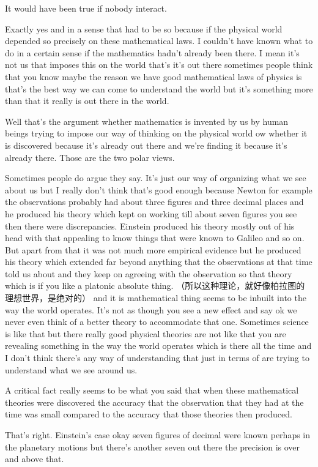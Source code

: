 \documentclass{article}
\begin{document}
It would have been true if nobody interact.

Exactly yes and in a sense that had to be so because if the physical world depended so precisely on these mathematical laws. I couldn't have known what to do in a certain sense if the mathematics hadn't already been there. I mean it's not us that imposes this on the world that's it's out there sometimes people think that you know maybe the reason we have good mathematical laws of physics is that's the best way we can come to understand the world but it's something more than that it really is out there in the world.

Well that's the argument whether mathematics is invented by us by human beings trying to impose our way of thinking on the physical world ow whether it is discovered because it's already out there and we're finding it because it's already there. Those are the two polar views.

Sometimes people do argue they say. It's just our way of organizing what we see about us but I really don't think that's good enough because Newton for example the observations probably had about three figures and three decimal places and he produced his theory which kept on working till about seven figures you see then there were discrepancies. Einstein produced his theory mostly out of his head with that appealing to know things that were known to Galileo and so on. But apart from that it was not much more empirical evidence but he produced his theory which extended far beyond anything that the observations at that time told us about and they keep on agreeing with the observation so that theory which is if you like a platonic absolute thing. （所以这种理论，就好像柏拉图的理想世界，是绝对的） and it is mathematical thing seems to be inbuilt into the way the world operates. It's not as though you see a new effect and say ok we never even think of a better theory to accommodate that one. Sometimes science is like that but there really good physical theories are not like that you are revealing something in the way the world operates which is there all the time and I don't think there's any way of understanding that just in terms of are trying to understand what we see around us.

A critical fact really seems to be what you said that when these mathematical theories were discovered the accuracy that the observation that they had at the time was small compared to the accuracy that those theories then produced.

That's right. Einstein's case okay seven figures of decimal were known perhaps in the planetary motions but there's another seven out there the precision is over and above that.
\end{document}
